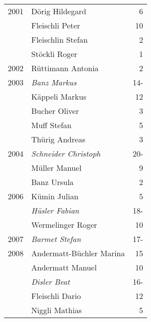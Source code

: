 {\begin{longtable}{ l l r }
        2001          & Dörig Hildegard                           & 6           \\
                      & Fleischli Peter                           & 10          \\
                      & Fleischlin Stefan                         & 2           \\
                      & Stöckli Roger                             & 1           \\
        2002          & Rüttimann Antonia                         & 2           \\
        2003          & \emph{Banz Markus}                        & 14-         \\
                      & Käppeli Markus                            & 12          \\
                      & Bucher Oliver                             & 3           \\
                      & Muff Stefan                               & 5           \\
                      & Thürig Andreas                            & 3           \\
        2004          & \emph{Schneider Christoph}                & 20-         \\
                      & Müller Manuel                             & 9           \\
                      & Banz Ursula                               & 2           \\
        2006          & Kümin Julian                              & 5           \\
                      & \emph{Hüsler Fabian}                      & 18-         \\
                      & Wermelinger Roger                         & 10          \\
        2007          & \emph{Barmet Stefan}                      & 17-         \\
        2008          & Andermatt-Büchler Marina                  & 15          \\
                      & Andermatt Manuel                          & 10          \\
                      & \emph{Disler Beat}                        & 16-         \\
                      & Fleischli Dario                           & 12          \\
                      & Niggli Mathias                            & 5           \\

\end{longtable}}
